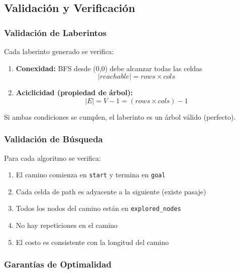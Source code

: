 \documentclass[12pt,a4paper]{article}
\begin{document}
\subsection{Validación y Verificación}

\subsubsection{Validación de Laberintos}

Cada laberinto generado se verifica:

\begin{enumerate}
    \item \textbf{Conexidad:} BFS desde (0,0) debe alcanzar todas las celdas
    \begin{equation}
        |reachable| = rows \times cols
    \end{equation}
    
    \item \textbf{Aciclicidad (propiedad de árbol):}
    \begin{equation}
        |E| = V - 1 = (rows \times cols) - 1
    \end{equation}
\end{enumerate}

Si ambas condiciones se cumplen, el laberinto es un árbol válido (perfecto).

\subsubsection{Validación de Búsqueda}

Para cada algoritmo se verifica:

\begin{enumerate}
    \item El camino comienza en \texttt{start} y termina en \texttt{goal}
    \item Cada celda de path es adyacente a la siguiente (existe pasaje)
    \item Todos los nodos del camino están en \texttt{explored\_nodes}
    \item No hay repeticiones en el camino
    \item El costo es consistente con la longitud del camino
\end{enumerate}

\subsubsection{Garantías de Optimalidad}
\end{document}
